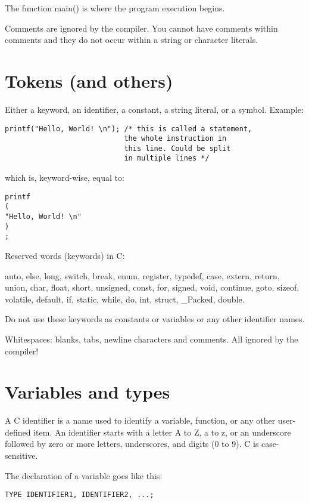 \documentclass[11pt]{article}
\begin{document}
The function main() is where the program execution begins.

Comments are ignored by the compiler. You cannot have comments within comments and they do not occur within a string or character literals.


\section{Tokens (and others)}


Either a keyword, an identifier, a constant, a string literal, or a symbol. Example:

\begin{lstlisting}
printf("Hello, World! \n"); /* this is called a statement,
                            the whole instruction in
                            this line. Could be split
                            in multiple lines */
\end{lstlisting}

which is, keyword-wise, equal to:

\begin{lstlisting}
printf
(
"Hello, World! \n"
)
;
\end{lstlisting}

Reserved words (keywords) in C:

auto, else, long, switch, break, enum, register, typedef, case, extern, return, union, char, float, short, unsigned, const, for, signed, void, continue, goto, sizeof, volatile, default, if, static, while, do, int, struct, \_Packed, double.

Do not use these keywords as constants or variables or any other identifier names.

Whitespaces: blanks, tabs, newline characters and comments. All ignored by the compiler!


\section{Variables and types}

A C identifier is a name used to identify a variable, function, or any other user-defined item. An identifier starts with a letter A to Z, a to z, or an underscore followed by zero or more letters, underscores, and digits (0 to 9). C is case-sensitive.

The declaration of a variable goes like this:

\begin{lstlisting}[numbers=none]
TYPE IDENTIFIER1, IDENTIFIER2, ...;
\end{lstlisting}
\end{document}
